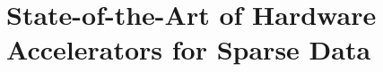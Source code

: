 
\chapter[State-of-the-Art]{State-of-the-Art of Hardware Accelerators for Sparse Data}
\label{cha:soa}

\minitoc






\clearpage